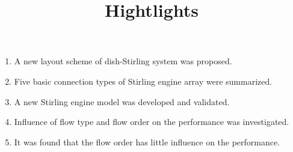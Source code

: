 \documentclass[12pt]{letter}
\begin{document}
\title{Hightlights}

\begin{enumerate}
\item A new layout scheme of dish-Stirling system was proposed.

\item Five basic connection types of Stirling engine array were summarized.

\item A new Stirling engine model was developed and validated.

\item Influence of flow type and flow order on the performance was investigated.

\item It was found that the flow order has little influence on the performance.
\end{enumerate}
\end{document}

